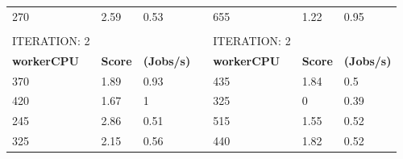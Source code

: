 \begin{table}[H]
\begin{tabular}{lllllll}
\multicolumn{1}{|l|}{270}                & \multicolumn{1}{l|}{2.59}           & \multicolumn{1}{l|}{0.53}             & \multicolumn{1}{l|}{}          & \multicolumn{1}{l|}{655}                & \multicolumn{1}{l|}{1.22}           & \multicolumn{1}{l|}{0.95}             \\ \cline{1-3} \cline{5-7} 
                                         &                                     &                                       &                                &                                         &                                     &                                       \\
ITERATION: 2                             &                                     &                                       &                                & ITERATION: 2                            &                                     &                                       \\ \cline{1-3} \cline{5-7} 
\multicolumn{1}{|l|}{\textbf{workerCPU}} & \multicolumn{1}{l|}{\textbf{Score}} & \multicolumn{1}{l|}{\textbf{(Jobs/s)}} & \multicolumn{1}{l|}{\textbf{}} & \multicolumn{1}{l|}{\textbf{workerCPU}} & \multicolumn{1}{l|}{\textbf{Score}} & \multicolumn{1}{l|}{\textbf{(Jobs/s)}} \\ \cline{1-3} \cline{5-7} 
\multicolumn{1}{|l|}{370}                & \multicolumn{1}{l|}{1.89}           & \multicolumn{1}{l|}{0.93}             & \multicolumn{1}{l|}{}          & \multicolumn{1}{l|}{435}                & \multicolumn{1}{l|}{1.84}           & \multicolumn{1}{l|}{0.5}              \\ \cline{1-3} \cline{5-7} 
\multicolumn{1}{|l|}{420}                & \multicolumn{1}{l|}{1.67}           & \multicolumn{1}{l|}{1}                & \multicolumn{1}{l|}{}          & \multicolumn{1}{l|}{325}                & \multicolumn{1}{l|}{0}              & \multicolumn{1}{l|}{0.39}             \\ \cline{1-3} \cline{5-7} 
\multicolumn{1}{|l|}{245}                & \multicolumn{1}{l|}{2.86}           & \multicolumn{1}{l|}{0.51}             & \multicolumn{1}{l|}{}          & \multicolumn{1}{l|}{515}                & \multicolumn{1}{l|}{1.55}           & \multicolumn{1}{l|}{0.52}             \\ \cline{1-3} \cline{5-7} 
\multicolumn{1}{|l|}{325}                & \multicolumn{1}{l|}{2.15}           & \multicolumn{1}{l|}{0.56}             & \multicolumn{1}{l|}{}          & \multicolumn{1}{l|}{440}                & \multicolumn{1}{l|}{1.82}           & \multicolumn{1}{l|}{0.52}             \\ \cline{1-3} \cline{5-7} 

\end{tabular}
\end{table}
